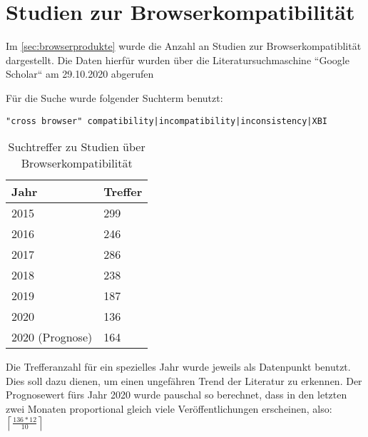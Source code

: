 \section{Studien zur Browserkompatibilität}
\label{sec:studien-zur-browser-kompatibilitaet}

Im \autoref{sec:browserprodukte} wurde die Anzahl an Studien zur Browserkompatiblität dargestellt. Die Daten hierfür wurden über die Literatursuchmaschine ``Google Scholar`` am 29.10.2020 abgerufen

Für die Suche wurde folgender Suchterm benutzt:
\begin{verbatim}
"cross browser" compatibility|incompatibility|inconsistency|XBI
\end{verbatim}

\begin{wraptable}[12]{r}{0.4\linewidth}
\centering
\begin{tabular}{|l|l|}
  \hline
  Jahr & Treffer \\
  \hline
  2015 & 299 \\
  \hline
  2016 & 246 \\
  \hline
  2017 & 286 \\
  \hline
  2018 & 238 \\
  \hline
  2019 & 187 \\
  \hline
  2020 & 136 \\
  \hline
  2020 (Prognose) & 164 \\
  \hline
\end{tabular}
\caption{Suchtreffer zu Studien über Browserkompatibilität}
\end{wraptable}

\def\lc{\left\lceil}   
\def\rc{\right\rceil}

Die Trefferanzahl für ein spezielles Jahr wurde jeweils als Datenpunkt benutzt. Dies soll dazu dienen, um einen ungefähren Trend der Literatur zu erkennen. Der Prognosewert fürs Jahr 2020 wurde pauschal so berechnet, dass in den letzten zwei Monaten proportional gleich viele Veröffentlichungen erscheinen, also: \( \lc \frac{136 * 12}{10} \rc\ \)